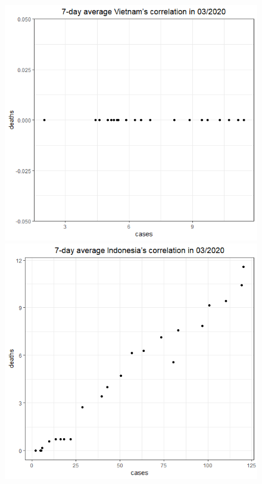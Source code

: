 \documentclass[a4paper]{article}
\theoremstyle{definition}
\begin{document}
\begin{enumerate}[1)]
\begin{figure}[H]
\begin{center}
        \includegraphics[scale = 0.3]{ix/ix.3/VN_03_2020.png}
        \includegraphics[scale = 0.3]{ix/ix.3/IDN_03_2020.png}

\end{center}
\end{figure}
\end{enumerate}
\end{document}
